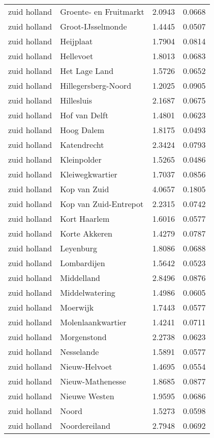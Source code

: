 \begin{longtable}{llcc}
zuid holland & Groente- en Fruitmarkt & 2.0943 & 0.0668 \\
zuid holland & Groot-IJsselmonde & 1.4445 & 0.0507 \\
zuid holland & Heijplaat & 1.7904 & 0.0814 \\
zuid holland & Hellevoet & 1.8013 & 0.0683 \\
zuid holland & Het Lage Land & 1.5726 & 0.0652 \\
zuid holland & Hillegersberg-Noord & 1.2025 & 0.0905 \\
zuid holland & Hillesluis & 2.1687 & 0.0675 \\
zuid holland & Hof van Delft & 1.4801 & 0.0623 \\
zuid holland & Hoog Dalem & 1.8175 & 0.0493 \\
zuid holland & Katendrecht & 2.3424 & 0.0793 \\
zuid holland & Kleinpolder & 1.5265 & 0.0486 \\
zuid holland & Kleiwegkwartier & 1.7037 & 0.0856 \\
zuid holland & Kop van Zuid & 4.0657 & 0.1805 \\
zuid holland & Kop van Zuid-Entrepot & 2.2315 & 0.0742 \\
zuid holland & Kort Haarlem & 1.6016 & 0.0577 \\
zuid holland & Korte Akkeren & 1.4279 & 0.0787 \\
zuid holland & Leyenburg & 1.8086 & 0.0688 \\
zuid holland & Lombardijen & 1.5642 & 0.0523 \\
zuid holland & Middelland & 2.8496 & 0.0876 \\
zuid holland & Middelwatering & 1.4986 & 0.0605 \\
zuid holland & Moerwijk & 1.7443 & 0.0577 \\
zuid holland & Molenlaankwartier & 1.4241 & 0.0711 \\
zuid holland & Morgenstond & 2.2738 & 0.0623 \\
zuid holland & Nesselande & 1.5891 & 0.0577 \\
zuid holland & Nieuw-Helvoet & 1.4695 & 0.0554 \\
zuid holland & Nieuw-Mathenesse & 1.8685 & 0.0877 \\
zuid holland & Nieuwe Westen & 1.9595 & 0.0686 \\
zuid holland & Noord & 1.5273 & 0.0598 \\
zuid holland & Noordereiland & 2.7948 & 0.0692 \\

\end{longtable}
